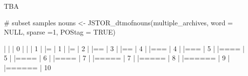 \documentclass[10pt]{article}
\newenvironment{CodeChunk}{}{}
\begin{document}
\begin{CodeChunk}
TBA

\begin{CodeChunk}
\begin{CodeInput}
# subset samples
nouns <- JSTOR_dtmofnouns(multiple_archives, word = NULL, sparse =1, POStag = TRUE)
\end{CodeInput}
\begin{CodeOutput}

  |                                                                       
  |                                                                 |   0%
  |                                                                       
  |                                                                 |   1%
  |                                                                       
  |=                                                                |   1%
  |                                                                       
  |=                                                                |   2%
  |                                                                       
  |==                                                               |   3%
  |                                                                       
  |==                                                               |   4%
  |                                                                       
  |===                                                              |   4%
  |                                                                       
  |===                                                              |   5%
  |                                                                       
  |====                                                             |   5%
  |                                                                       
  |====                                                             |   6%
  |                                                                       
  |====                                                             |   7%
  |                                                                       
  |=====                                                            |   7%
  |                                                                       
  |=====                                                            |   8%
  |                                                                       
  |======                                                           |   9%
  |                                                                       
  |======                                                           |  10%

\end{CodeOutput}
\end{CodeChunk}
\end{CodeChunk}
\end{document}
